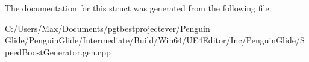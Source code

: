 The documentation for this struct was generated from the following file\+:\begin{DoxyCompactItemize}
\item 
C\+:/\+Users/\+Max/\+Documents/pgtbestprojectever/\+Penguin Glide/\+Penguin\+Glide/\+Intermediate/\+Build/\+Win64/\+U\+E4\+Editor/\+Inc/\+Penguin\+Glide/Speed\+Boost\+Generator.\+gen.\+cpp\end{DoxyCompactItemize}

